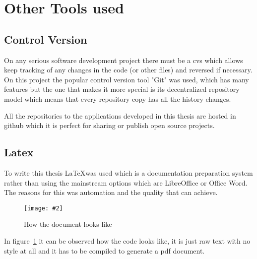 \documentclass[hidelinks,11pt,a4paper,oneside,article]{memoir}
\newcommand{\putimage}[3][10] %
{
\begin{figure}[h]
	\centering
	\captionsetup{justification=centering}
	\texttt{[image: \#2]}
	\caption{#3}
	\label{fig:#2}
\end{figure}
}
\begin{document}

\section{Other Tools used}

\subsection{Control Version}
On any serious software development project there must be a \gls{cvs} which allows keep tracking of any changes in the code (or other files) and reversed if necessary. On this project the popular control version tool "Git" was used, which has many features but the one that makes it more special is its decentralized repository model which means that every repository copy has all the history changes.

All the repositories to the applications developed in this thesis are hosted in \gls{github} which it is perfect for sharing or publish open source projects.

\subsection{Latex}
To write this thesis \LaTeX was used which is a documentation preparation system rather than using the mainstream options which are LibreOffice or Office Word. The reasons for this was automation and the quality that can achieve.

    \putimage{latex-look}{How the document looks like}
    
In figure~\ref{fig:latex-look} it can be observed how the code looks like, it is just raw text with no style at all and it has to be compiled to generate a \gls{pdf} document.
\end{document}
